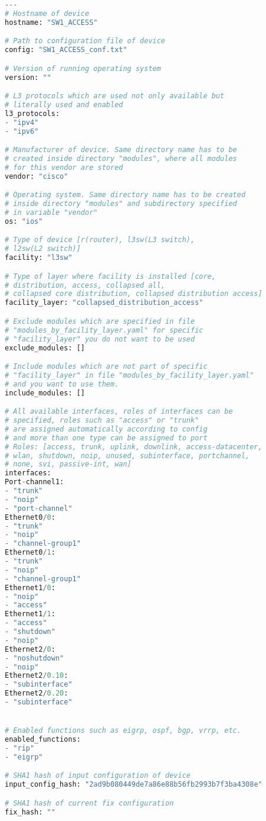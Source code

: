 \fi
\iffalse
\begin{lstlisting}[frame=single,numbers=right,caption={Konfiguračný súbor \texttt{device\_info.yaml}, ktorý popisuje základné informácie o~jednom konkrétnom zariadení},label=yaml:device_info,basicstyle=\ttfamily\small, keywordstyle=\color{black},language=python,breaklines=true]
---
# Hostname of device
hostname: "SW1_ACCESS"

# Path to configuration file of device
config: "SW1_ACCESS_conf.txt" 

# Version of running operating system
version: "" 

# L3 protocols which are used not only available but 
# literally used and enabled
l3_protocols:
- "ipv4"
- "ipv6"

# Manufacturer of device. Same directory name has to be 
# created inside directory "modules", where all modules
# for this vendor are stored
vendor: "cisco"

# Operating system. Same directory name has to be created
# inside directory "modules" and subdirectory specified
# in variable "vendor" 
os: "ios" 

# Type of device [r(router), l3sw(L3 switch),
# l2sw(L2 switch)]
facility: "l3sw" 

# Type of layer where facility is installed [core, 
# distribution, access, collapsed all, 
# collapsed core distribution, collapsed distribution access]
facility_layer: "collapsed_distribution_access" 

# Exclude modules which are specified in file
# "modules_by_facility_layer.yaml" for specific 
# "facility_layer" you do not want to be used
exclude_modules: []

# Include modules which are not part of specific
# "facility_layer" in file "modules_by_facility_layer.yaml"
# and you want to use them.
include_modules: []

# All available interfaces, roles of interfaces can be 
# specified, roles such as "access" or "trunk" 
# are assigned automatically according to config 
# and more than one type can be assigned to port  
# Roles: [access, trunk, uplink, downlink, access-datacenter,
# wlan, shutdown, noip, unused, subinterface, portchannel, 
# none, svi, passive-int, wan] 
interfaces:
Port-channel1:
- "trunk"
- "noip"
- "port-channel"
Ethernet0/0:
- "trunk"
- "noip"
- "channel-group1"
Ethernet0/1:
- "trunk"
- "noip"
- "channel-group1"
Ethernet1/0:
- "noip"
- "access"
Ethernet1/1:
- "access"
- "shutdown"
- "noip"
Ethernet2/0:
- "noshutdown"
- "noip"
Ethernet2/0.10:
- "subinterface"
Ethernet2/0.20:
- "subinterface"


# Enabled functions such as eigrp, ospf, bgp, vrrp, etc.
enabled_functions:
- "rip"
- "eigrp"

# SHA1 hash of input configuration of device
input_config_hash: "2ad9b080449de7a86e88b56fb2993b7f3ba4308e"

# SHA1 hash of current fix configuration 
fix_hash: ""

\end{lstlisting}
